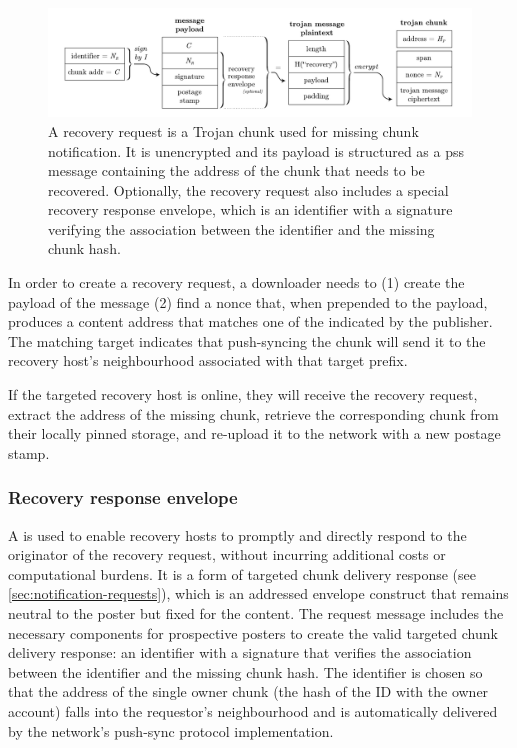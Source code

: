 \begin{figure}[htbp]
  \centering
  \includegraphics[width=\textwidth]{fig/recovery-request.pdf}
  \caption[Recovery request \statusgreen]{A recovery request is a Trojan chunk used for missing chunk notification. It is unencrypted and its payload is structured as a pss message containing the address of the chunk that needs to be recovered. Optionally, the recovery request also includes a special recovery response envelope, which is an identifier with a signature verifying the association between the identifier and the missing chunk hash.}
  \label{fig:recovery-request}
\end{figure}

In order to create a recovery request, a downloader needs to (1) create the payload of the message (2) find a nonce that, when prepended to the payload, produces a content address that matches one of the  indicated by the publisher. The matching target indicates that push-syncing the chunk will send it to the recovery host's neighbourhood associated with that target prefix. 

If the targeted recovery host is online, they will receive the recovery request, extract the address of the missing chunk, retrieve the corresponding chunk from their locally pinned storage, and re-upload it to the network with a new postage stamp.

\subsubsection{Recovery response envelope}

A  is used to enable recovery hosts to promptly and directly respond to the originator of the recovery request, without incurring additional costs or computational burdens. It is a form of targeted chunk delivery response (see \ref{sec:notification-requests}), which is an addressed envelope construct that remains neutral to the poster but fixed for the content. The request message includes the necessary components for prospective posters to create the valid targeted chunk delivery response: an identifier with a signature that verifies the association between the identifier and the missing chunk hash. The identifier is chosen so that the address of the single owner chunk (the hash of the ID with the owner account) falls into the requestor's neighbourhood and is automatically delivered by the network's push-sync protocol implementation.

